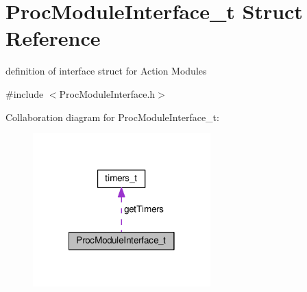 \hypertarget{structProcModuleInterface__t}{}\section{Proc\+Module\+Interface\+\_\+t Struct Reference}
\label{structProcModuleInterface__t}


definition of interface struct for Action Modules  




{\ttfamily \#include $<$Proc\+Module\+Interface.\+h$>$}



Collaboration diagram for Proc\+Module\+Interface\+\_\+t\+:
\nopagebreak
\begin{figure}[H]
\begin{center}
\leavevmode
\includegraphics[width=194pt]{structProcModuleInterface__t__coll__graph}
\end{center}
\end{figure}
